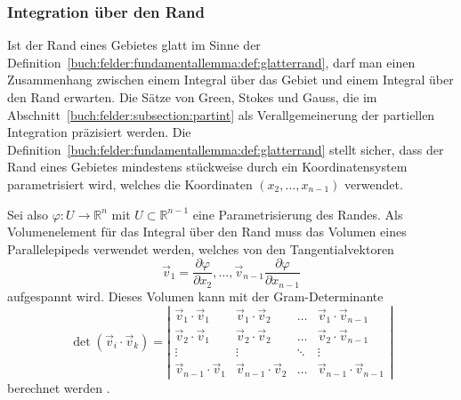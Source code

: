 \subsubsection{Integration über den Rand}
Ist der Rand eines Gebietes glatt im Sinne der
Definition~\ref{buch:felder:fundamentallemma:def:glatterrand},
darf man einen Zusammenhang zwischen einem Integral über das Gebiet
und einem Integral über den Rand erwarten.
Die Sätze von Green, Stokes und Gauss, die im
Abschnitt~\ref{buch:felder:subsection:partint} als Verallgemeinerung
der partiellen Integration präzisiert werden.
Die Definition~\ref{buch:felder:fundamentallemma:def:glatterrand}
stellt sicher, dass der Rand eines Gebietes mindestens stückweise
durch ein Koordinatensystem parametrisiert wird, welches die
Koordinaten $(x_2,\dots,x_{n-1})$ verwendet.

Sei also $\varphi\colon U\to\mathbb{R}^n$ mit $U\subset\mathbb{R}^{n-1}$
eine Parametrisierung des Randes.
Als Volumenelement für das Integral über den Rand muss das Volumen
eines Parallelepipeds verwendet werden, welches von den Tangentialvektoren
\[
\vec{v}_1
=
\frac{\partial\varphi}{\partial x_2},
\dots,
\vec{v}_{n-1}
\frac{\partial\varphi}{\partial x_{n-1}}
\]
aufgespannt wird.
Dieses Volumen kann mit der Gram-Determinante
\[
\det(\vec{v}_i\cdot\vec{v}_k)
=
\left|
\begin{matrix}
\vec{v}_1\cdot\vec{v}_1
	& \vec{v}_1\cdot\vec{v}_2
		& \dots
			& \vec{v}_1\cdot\vec{v}_{n-1}\\
\vec{v}_2\cdot\vec{v}_1
	& \vec{v}_2\cdot\vec{v}_2
		& \dots
			& \vec{v}_2\cdot\vec{v}_{n-1}\\
\vdots&\vdots&\ddots&\vdots\\
\vec{v}_{n-1}\cdot\vec{v}_1
	& \vec{v}_{n-1}\cdot\vec{v}_2
		& \dots
			& \vec{v}_{n-1}\cdot\vec{v}_{n-1}
\end{matrix}
\right|
\]
berechnet werden \cite{buch:linalg}.





